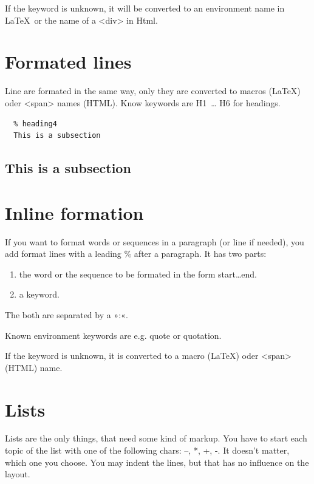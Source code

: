 \documentclass{article}
\begin{document}
{If the keyword is unknown, it will be converted to an environment
name in \LaTeX\  or the name of a <div> in Html.\\}

\section{Formated lines}
\label{}

{Line are formated in the same way, only they are converted
to macros (LaTeX) oder <span> names (HTML). Know keywords
are H1~… H6 for headings.\\}

\begin{verbatim}
  % heading4
  This is a subsection
\end{verbatim}


\subsection{This is a subsection}
\label{}

\section{Inline formation}
\label{}

{If you want to format words or sequences in a paragraph (or
line if needed), you add format lines with a leading \% after
a paragraph. It has two parts:\\}

\begin{enumerate}
\item the word or the sequence to be formated in the form
  start…end. 
\item a keyword.
\end{enumerate}


{The both are separated by a »:«.\\}

{Known environment keywords are e.g. quote or quotation.\\}

{If the keyword is unknown, it is converted to a macro
(LaTeX) oder <span> (HTML) name.\\}

\section{Lists}
\label{}

{Lists are the only things, that need some kind of
markup. You have to start each topic of the list with one of
the following chars: –, *, +, -. It doesn't matter, which one you
choose. You may indent the lines, but that has no influence
on the layout.\\}
\end{document}
